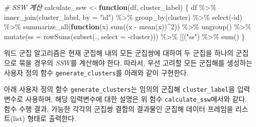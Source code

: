 \documentclass[
]{book}
\newenvironment{Shaded}{\begin{snugshade}}{\end{snugshade}}
\newcommand{\AttributeTok}[1]{\textcolor[rgb]{0.77,0.63,0.00}{#1}}
\newcommand{\CommentTok}[1]{\textcolor[rgb]{0.56,0.35,0.01}{\textit{#1}}}
\newcommand{\ControlFlowTok}[1]{\textcolor[rgb]{0.13,0.29,0.53}{\textbf{#1}}}
\newcommand{\DecValTok}[1]{\textcolor[rgb]{0.00,0.00,0.81}{#1}}
\newcommand{\FunctionTok}[1]{\textcolor[rgb]{0.00,0.00,0.00}{#1}}
\newcommand{\NormalTok}[1]{#1}
\newcommand{\OtherTok}[1]{\textcolor[rgb]{0.56,0.35,0.01}{#1}}
\newcommand{\SpecialCharTok}[1]{\textcolor[rgb]{0.00,0.00,0.00}{#1}}
\newcommand{\StringTok}[1]{\textcolor[rgb]{0.31,0.60,0.02}{#1}}
\begin{document}
\begin{Shaded}
\begin{Highlighting}[]
\CommentTok{\# SSW 계산}
\NormalTok{calculate\_ssw }\OtherTok{\textless{}{-}} \ControlFlowTok{function}\NormalTok{(df, cluster\_label) \{}
\NormalTok{  df }\SpecialCharTok{\%\textgreater{}\%}
    \FunctionTok{inner\_join}\NormalTok{(cluster\_label, }\AttributeTok{by =} \StringTok{"id"}\NormalTok{) }\SpecialCharTok{\%\textgreater{}\%}
    \FunctionTok{group\_by}\NormalTok{(cluster) }\SpecialCharTok{\%\textgreater{}\%}
    \FunctionTok{select}\NormalTok{(}\SpecialCharTok{{-}}\NormalTok{id) }\SpecialCharTok{\%\textgreater{}\%}
    \FunctionTok{summarize\_all}\NormalTok{(}\ControlFlowTok{function}\NormalTok{(x) }\FunctionTok{sum}\NormalTok{((x }\SpecialCharTok{{-}} \FunctionTok{mean}\NormalTok{(x))}\SpecialCharTok{\^{}}\DecValTok{2}\NormalTok{)) }\SpecialCharTok{\%\textgreater{}\%}
    \FunctionTok{ungroup}\NormalTok{() }\SpecialCharTok{\%\textgreater{}\%}
    \FunctionTok{mutate}\NormalTok{(}\AttributeTok{ss =} \FunctionTok{rowSums}\NormalTok{(}\FunctionTok{subset}\NormalTok{(., }\AttributeTok{select =} \SpecialCharTok{{-}}\NormalTok{cluster))) }\SpecialCharTok{\%\textgreater{}\%}
    \StringTok{\textasciigrave{}}\AttributeTok{[[}\StringTok{\textasciigrave{}}\NormalTok{(}\StringTok{"ss"}\NormalTok{) }\SpecialCharTok{\%\textgreater{}\%}
    \FunctionTok{sum}\NormalTok{()}
\NormalTok{\}}
\end{Highlighting}
\end{Shaded}

워드 군집 알고리즘은 현재 군집해 내의 모든 군집쌍에 대하여 두 군집을 하나의 군집으로 묶을 경우의 \(SSW\)를 계산해야 한다. 따라서, 우선 고려할 모든 군집해를 생성하는 사용자 정의 함수 \texttt{generate\_clusters}를 아래와 같이 구현한다.

아래 사용자 정의 함수 \texttt{generate\_clusters}는 임의의 군집해 \texttt{cluster\_label}을 입력변수로 사용하며, 해당 입력변수에 대한 설명은 위 함수 \texttt{calculate\_ssw}에서와 같다. 함수 수행 결과, 가능한 각각의 군집쌍 결합의 결과물인 군집해 데이터 프레임을 리스트(list) 형태로 출력한다.
\end{document}
